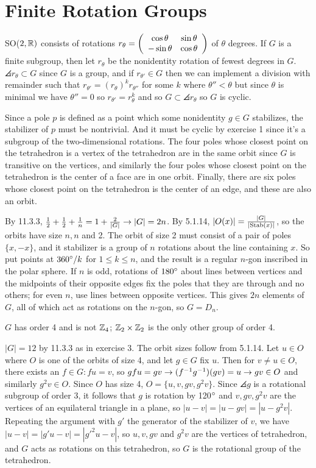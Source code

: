 \documentclass[11pt, oneside]{article}   	%
\begin{document}
\section{Finite Rotation Groups}
\be
\item SO($2, \mathbb{R})$ consists of rotations $r_\theta = \left( \begin{array}{ccc} \cos{\theta} & \sin{\theta} \\ -\sin{\theta} & \cos{\theta} \end{array} \right)$ of $\theta$ degrees. If $G$ is a finite subgroup, then let $r_\theta$ be the nonidentity rotation of fewest degrees in $G$. $\angles{r_\theta} \subset G$ since $G$ is a group, and if $r_{\theta'} \in G$ then we can implement a division with remainder such that $r_{\theta'} = (r_\theta)^kr_{\theta''}$ for some $k$ where $\theta'' < \theta$ but since $\theta$ is minimal we have $\theta'' = 0$ so $r_{\theta'} = r_\theta^k$ and so $G \subset \angles{r_\theta}$ so $G$ is cyclic.
\item Since a pole $p$ is defined as a point which some nonidentity $g \in G$ stabilizes, the stabilizer of $p$ must be nontrivial. And it must be cyclic by exercise 1 since it's a subgroup of the two-dimensional rotations. The four poles whose closest point on the tetrahedron is a vertex of the tetrahedron are in the same orbit since $G$ is transitive on the vertices, and similarly the four poles whose closest point on the tetrahedron is the center of a face are in one orbit. Finally, there are six poles whose closest point on the tetrahedron is the center of an edge, and these are also an orbit.
\item By 11.3.3, $\frac{1}{2} + \frac{1}{2} + \frac{1}{n} = 1 + \frac{2}{|G|} \rightarrow |G| = 2n$. By 5.1.14, $|O(x)| = \frac{|G|}{|\text{Stab}(x)|}$, so the orbits have size $n, n$ and 2. The orbit of size 2 must consist of a pair of poles $\{x, -x\}$, and it stabilizer is a group of $n$ rotations about the line containing $x$. So put points at $360^\circ /k$ for $1\le k \le n$, and the result is a regular $n$-gon inscribed in the polar sphere. If $n$ is odd, rotations of $180^\circ$ about lines between vertices and the midpoints of their opposite edges fix the poles that they are through and no others; for even $n$, use lines between opposite vertices. This gives $2n$ elements of $G$, all of which act as rotations on the $n$-gon, so $G=D_n$.
\item $G$ has order 4 and is not $\mathbb{Z}_4$; $\mathbb{Z}_2 \times \mathbb{Z}_2$ is the only other group of order 4.
\item $|G| = 12$ by 11.3.3 as in exercise 3. The orbit sizes follow from 5.1.14. Let $u \in O$ where $O$ is one of the orbits of size 4, and let $g \in G$ fix $u$. Then for $v \not = u \in O$, there exists an $f \in G: fu=v$, so $gfu = gv \rightarrow (f^{-1} g^{-1})(gv) = u \rightarrow gv \in O$ and similarly $g^2 v \in O$. Since $O$ has size 4, $O = \{u, v, gv, g^2v\}$. Since $\angles{g}$ is a rotational subgroup of order 3, it follows that $g$ is rotation by 120$^\circ$ and $v, gv, g^2v$ are the vertices of an equilateral triangle in a plane, so $|u-v| = |u-gv| = |u-g^2v|$. Repeating the argument with $g'$ the generator of the stabilizer of $v$, we have $|u-v| = |g'u-v| = |g'^2u-v|$, so $u, v, gv$ and $g^2v$ are the vertices of tetrahedron, and $G$ acts as rotations on this tetrahedron, so $G$ is the rotational group of the tetrahedron.
\end{document}
